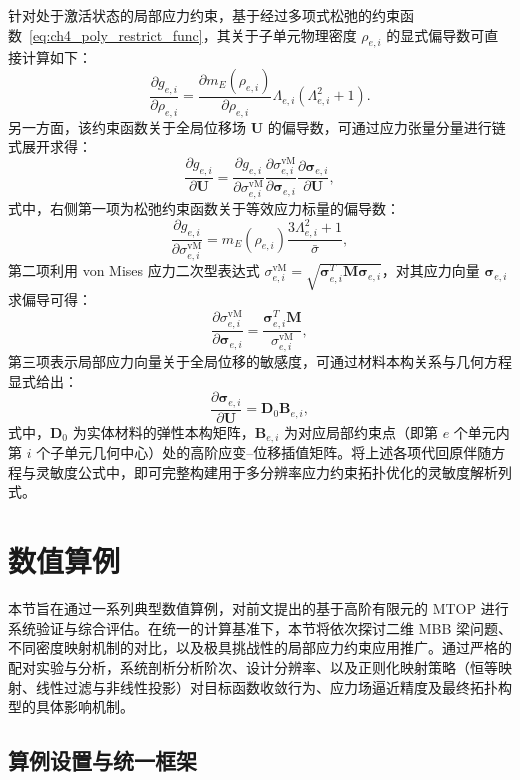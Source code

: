 针对处于激活状态的局部应力约束，基于经过多项式松弛的约束函数~\eqref{eq:ch4_poly_restrict_func}，其关于子单元物理密度 $\rho_{e,i}$ 的显式偏导数可直接计算如下：
\[
\frac{\partial g_{e,i}}{\partial\rho_{e,i}} = \frac{\partial m_E(\rho_{e,i})}{\partial\rho_{e,i}}\Lambda_{e,i}(\Lambda_{e,i}^2 + 1).
\]
另一方面，该约束函数关于全局位移场 $\boldsymbol{U}$ 的偏导数，可通过应力张量分量进行链式展开求得：
\[
\frac{\partial g_{e,i}}{\partial \boldsymbol{U}} = \frac{\partial g_{e,i}}{\partial\sigma_{e,i}^{\text{vM}}} \frac{\partial\sigma_{e,i}^{\text{vM}}}{\partial\boldsymbol{\sigma}_{e,i}} \frac{\partial\boldsymbol{\sigma}_{e,i}}{\partial \boldsymbol{U}},
\]
式中，右侧第一项为松弛约束函数关于等效应力标量的偏导数：
\[
\frac{\partial g_{e,i}}{\partial\sigma_{e,i}^{\text{vM}}} = m_E(\rho_{e,i})\frac{3\Lambda_{e,i}^2 + 1}{\bar{\sigma}},
\]
第二项利用 von Mises 应力二次型表达式 $\sigma_{e,i}^{\text{vM}} = \sqrt{\boldsymbol{\sigma}_{e,i}^T \boldsymbol{M} \boldsymbol{\sigma}_{e,i}}$，对其应力向量 $\boldsymbol{\sigma}_{e,i}$ 求偏导可得：
\[
\frac{\partial\sigma_{e,i}^{\text{vM}}}{\partial\boldsymbol{\sigma}_{e,i}} = \frac{\boldsymbol{\sigma}_{e,i}^T \boldsymbol{M}}{\sigma_{e,i}^{\text{vM}}},
\]
第三项表示局部应力向量关于全局位移的敏感度，可通过材料本构关系与几何方程显式给出：
\[
\frac{\partial\boldsymbol{\sigma}_{e,i}}{\partial \boldsymbol{U}} = \boldsymbol{D}_0\boldsymbol{B}_{e,i},
\]
式中，$\boldsymbol{D}_0$ 为实体材料的弹性本构矩阵，$\boldsymbol{B}_{e,i}$ 为对应局部约束点（即第 $e$ 个单元内第 $i$ 个子单元几何中心）处的高阶应变--位移插值矩阵。将上述各项代回原伴随方程与灵敏度公式中，即可完整构建用于多分辨率应力约束拓扑优化的灵敏度解析列式。


\section{数值算例}
\label{sec:ch4_numerical_examples}

本节旨在通过一系列典型数值算例，对前文提出的基于高阶有限元的 MTOP 进行系统验证与综合评估。在统一的计算基准下，本节将依次探讨二维 MBB 梁问题、不同密度映射机制的对比，以及极具挑战性的局部应力约束应用推广。通过严格的配对实验与分析，系统剖析分析阶次、设计分辨率、以及正则化映射策略（恒等映射、线性过滤与非线性投影）对目标函数收敛行为、应力场逼近精度及最终拓扑构型的具体影响机制。


\subsection{算例设置与统一框架}
\label{subsec:ch4_setup_framework}


